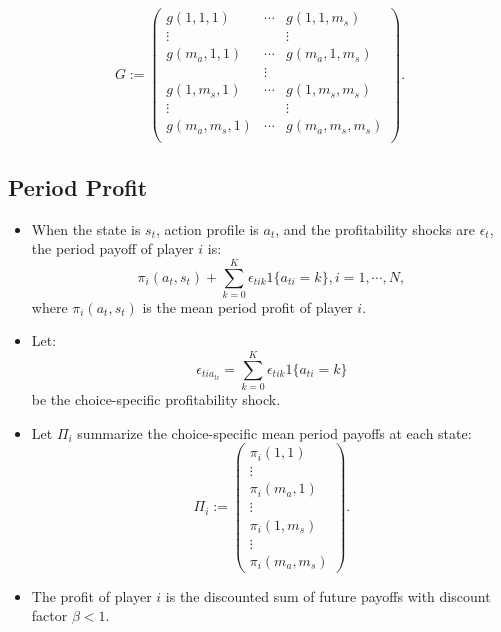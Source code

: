 \documentclass[
]{book}
\begin{document}
\begin{equation}
G := 
\begin{pmatrix}
g(1, 1, 1) & \cdots & g(1, 1, m_s)\\
\vdots & & \vdots \\
g(m_a, 1, 1) & \cdots & g(m_a, 1, m_s)\\
&\vdots& \\
g(1, m_s, 1) & \cdots & g(1, m_s, m_s)\\
\vdots & & \vdots \\
g(m_a, m_s, 1) & \cdots & g(m_a, m_s, m_s)\\
\end{pmatrix}.
\end{equation}

\hypertarget{period-profit}{%
\subsection{Period Profit}\label{period-profit}}

\begin{itemize}
\item
  When the state is \(s_t\), action profile is \(a_t\), and the
  profitability shocks are \(\epsilon_t\), the period payoff of player
  \(i\) is: \begin{equation}
  \pi_i(a_t, s_t) + \sum_{k = 0}^K \epsilon_{tik}1\{a_{ti} = k\}, i = 1, \cdots, N,
  \end{equation} where \(\pi_i(a_t, s_t)\) is the mean period profit of
  player \(i\).
\item
  Let: \[
  \epsilon_{ti a_{ti}} = \sum_{k = 0}^K \epsilon_{tik}1\{a_{ti} = k\}
  \] be the choice-specific profitability shock.
\item
  Let \(\Pi_i\) summarize the choice-specific mean period payoffs at
  each state: \begin{equation}
  \Pi_i :=
  \begin{pmatrix}
  \pi_i(1, 1)\\
  \vdots\\
  \pi_i(m_a, 1)\\
  \vdots\\
  \pi_i(1, m_s)\\
  \vdots\\
  \pi_i(m_a, m_s)
  \end{pmatrix}.
  \end{equation}
\item
  The profit of player \(i\) is the discounted sum of future payoffs
  with discount factor \(\beta < 1\).
\end{itemize}
\end{document}
